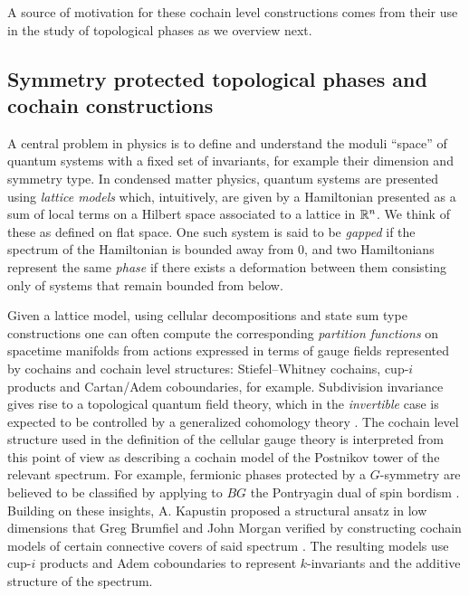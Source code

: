 A source of motivation for these cochain level constructions comes from their use in the study of topological phases as we overview next.

\subsection{Symmetry protected topological phases and cochain constructions}

A central problem in physics is to define and understand the moduli ``space'' of quantum systems with a fixed set of invariants, for example their dimension and symmetry type.
In condensed matter physics, quantum systems are
presented using \textit{lattice models} which, intuitively, are given by a Hamiltonian presented as a sum of local terms on a Hilbert space associated to a lattice in $\mathbb{R}^n$.
We think of these as defined on flat space.
One such system is said to be \textit{gapped} if the spectrum of the Hamiltonian is bounded away from $0$, and two Hamiltonians represent the same \textit{phase} if there exists a deformation between them consisting only of systems that remain bounded from below.

Given a lattice model, using cellular decompositions and state sum type constructions one can often compute the corresponding \textit{partition functions} on spacetime manifolds from actions expressed in terms of gauge fields represented by cochains and cochain level structures: Stiefel--Whitney cochains, cup-$i$ products and Cartan/Adem coboundaries, for example.
Subdivision invariance gives rise to a topological quantum field theory, which in the \textit{invertible} case is expected to be controlled by a generalized cohomology theory \cite{xiong2018minimalist, gaiotto2019cohomology, freed2021reflection}.
The cochain level structure used in the definition of the cellular gauge theory is interpreted from this point of view as describing a cochain model of the Postnikov tower of the relevant spectrum.
For example, fermionic phases protected by a $G$-symmetry are believed to be classified by applying to $BG$ the Pontryagin dual of spin bordism \cite{kapustin2015cobordism, kapustin2017fermionic}.
Building on these insights, A. Kapustin proposed a structural ansatz in low dimensions that Greg Brumfiel and John Morgan verified by constructing cochain models of certain connective covers of said spectrum \cite{brumfiel2016pontrjagin, brumfiel2018pontrjagin}.
The resulting models use cup-$i$ products and Adem coboundaries to represent $k$-invariants and the additive structure of the spectrum.

